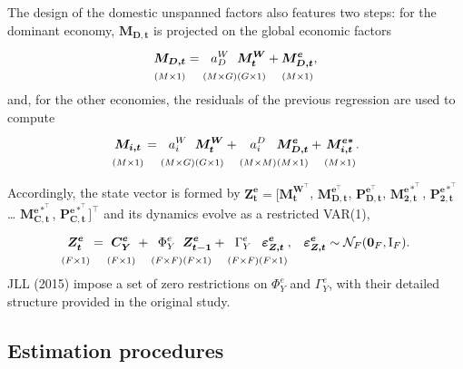 The design of the domestic unspanned factors also features two steps: for the dominant economy, \(\boldsymbol{M_{D,t}}\) is projected on the global economic factors
\begin{equation}
    \underset{(M \times 1)}{\vphantom{\Big|}
    \boldsymbol{M_{D,t}}} =
    \underset{(M \times G)}{\vphantom{\Big|}
    a_D^W}
    \underset{(G \times 1)}{\vphantom{\Big|}
    \boldsymbol{M_t^W}} +
    \underset{(M \times 1)}{\vphantom{\Big|}
    \boldsymbol{M_{D,t}^e}} \text{,}
\label{eq:MacroOrthoDU}
\end{equation}
and, for the other economies, the residuals of the previous regression are used to compute
\begin{equation}
      \underset{(M \times 1)}{\vphantom{\Big|}
      \boldsymbol{M_{i,t}}} =
      \underset{(M \times G)}{\vphantom{\Big|}
      a_i^W}
      \underset{(G \times 1)}{\vphantom{\Big|}
      \boldsymbol{M_t^W}} +
      \underset{(M \times M)}{\vphantom{\Big|}
      a_i^D}
      \underset{(M \times 1)}{\vphantom{\Big|}
      \boldsymbol{M_{D,t}^e}} +
      \underset{(M \times 1)}{\vphantom{\Big|}
      \boldsymbol{M_{i,t}^{e*}}}\text{.}
\label{eq:MacroOrthoNonDU}
\end{equation}

Accordingly, the state vector is formed by \(\boldsymbol{Z_t^e}= [\boldsymbol{M_t^{W^\top}}\), \(\boldsymbol{M_{D,t}^{e^\top}}\), \(\boldsymbol{P_{D,t}^{e^\top}}\), \(\boldsymbol{M_{2,t}^{e*^\top}}\), \(\boldsymbol{P_{2,t}^{e*^\top}}\) \ldots{} \(\boldsymbol{M_{C,t}^{e*^\top}}\), \(\boldsymbol{P_{C,t}^{e*^\top}}]^\top\) and its dynamics evolve as a restricted VAR(1),
\begin{align}
& \underset{(F \times 1)}{\vphantom{\Big|}
\boldsymbol{Z_t^e}}=
\underset{(F \times 1)}{\vphantom{\Big|}
\boldsymbol{C^{e}_Y}} +
\underset{(F \times F)}{\vphantom{\Big|}
\Phi^e_Y}
\underset{(F \times 1)}{\vphantom{\Big|}
\boldsymbol{Z_{t-1}^e}} +
\underset{(F \times F)}{\vphantom{\Big|}
\Gamma_{Y}^e}
\underset{(F \times 1)}{\vphantom{\Big|}
\boldsymbol{\varepsilon^e_{Z,t}}}\text{,}  &  \boldsymbol{\varepsilon _{Z,t}^{e}} \sim {\mathcal{N}_F}(\boldsymbol{0}_F,\mathrm{I}_F).
\label{eq:VAROrtho}
\end{align}
JLL (2015) impose a set of zero restrictions on \(\Phi^e_Y\) and \(\Gamma_{Y}^e\), with their detailed structure provided in the original study.

\subsection{Estimation procedures}\label{S:ATSMestimation}

